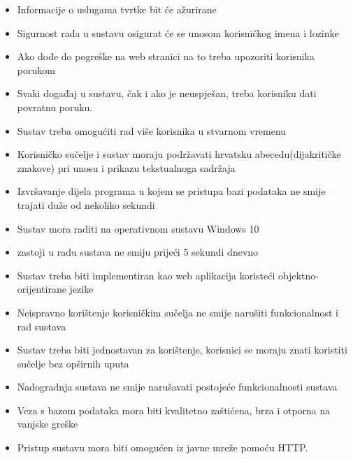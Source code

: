 		\begin{itemize}
			
			\item Informacije o uslugama tvrtke bit će ažurirane
			\item Sigurnost rada u sustavu osigurat će se unosom korisničkog imena i lozinke
			\item Ako dođe do pogreške na web stranici na to treba upozoriti korisnika porukom
			\item Svaki događaj u sustavu, čak i ako je neuspješan, treba korisniku dati povratnu poruku.
			\item Sustav treba omogućiti rad više korisnika u stvarnom vremenu
			\item Korisničko sučelje i sustav moraju podržavati hrvatsku abecedu(dijakritičke znakove) pri unosu i prikazu tekstualnoga sadržaja
			\item Izvršavanje dijela programa u kojem se pristupa bazi podataka ne smije trajati duže od nekoliko sekundi
			\item Sustav mora raditi na operativnom sustavu Windows 10
			\item zastoji u radu sustava ne smiju prijeći 5 sekundi dnevno
			\item Sustav treba biti implementiran kao web aplikacija koristeći objektno-orijentirane jezike
			\item Neispravno korištenje korisničkim sučelja ne smije narušiti funkcionalnost i rad sustava
			\item Sustav treba biti jednostavan za korištenje, korisnici se moraju znati koristiti sučelje bez opširnih uputa
			\item Nadogradnja sustava ne smije narušavati postojeće funkcionalnosti sustava
			\item Veza s bazom podataka mora biti kvalitetno zaštićena, brza i otporna na vanjske greške
			\item Pristup sustavu mora biti omogućen iz javne mreže pomoću HTTP.
						
		\end{itemize}
			 
			 
			 
	